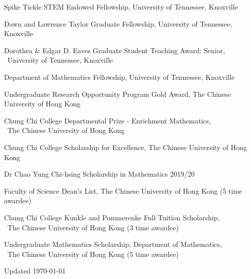 \documentclass[11pt,letterpaper]{report}
\begin{document}
    \begin{tablist}
        \item[2026] \tab{} Spike Tickle STEM Endowed Fellowship, University of Tennessee, Knoxville
        \item[2025] \tab{} Dawn and Lawrence Taylor Graduate Fellowship, University of Tennessee, Knoxville
        \item[2025] \tab{} Dorothea \& Edgar D. Eaves Graduate Student Teaching Award: Senior,\\
        \  University of Tennessee, Knoxville
        \item[2022] \tab{} Department of Mathematics Fellowship, University of Tennessee, Knoxville
        \item[2022] \tab{} Undergraduate Research Opportunity Program Gold Award, The Chinese University of Hong Kong
        \item[2022] \tab{} Chung Chi College Departmental Prize - Enrichment Mathematics,\\
        \ The Chinese University of Hong Kong
        \item[2021] \tab{} Chung Chi College Scholarship for Excellence, The Chinese University of Hong Kong
        \item[2019] \tab{} Dr Chao Yung Chi-hsing Scholarship in Mathematics 2019/20

        \item[2017-2022] \tab{} Faculty of Science Dean's List, The Chinese University of Hong Kong (5 time awardee)
        \item[2017-2022] \tab{} Chung Chi College Kunkle and Pommerenke Full Tuition Scholarship,\\
        \ The Chinese University of Hong Kong (3 time awardee)
        \item[2017-2022] \tab{} Undergraduate Mathematics Scholarship, Department of Mathematics,\\
        \ The Chinese University of Hong Kong (5 time awardee)



    \end{tablist}









    \begin{center}
        \vfill
        Updated \monthyeardate\today
    \end{center}
\end{document}
